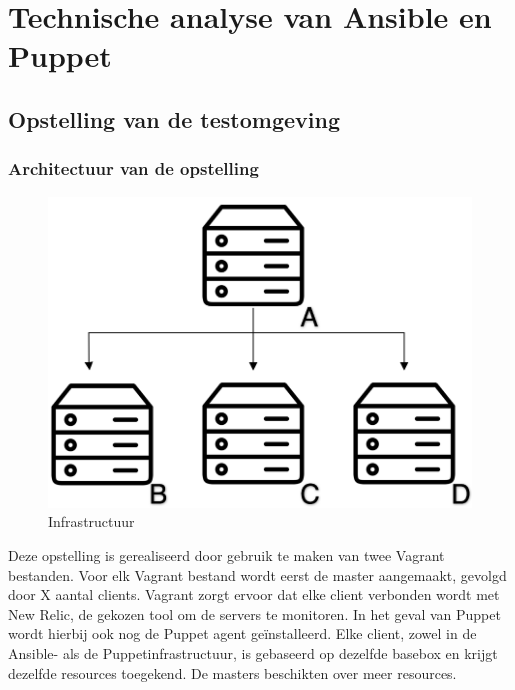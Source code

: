 
\section{Technische analyse van Ansible en Puppet}
\label{sec:technischeanalyse}
\subsection{Opstelling van de testomgeving}
\label{sec:opstellingtestevn}
\subsubsection{Architectuur van de opstelling}


\begin{figure}
	\includegraphics[width=0.9\linewidth]{img/infrastructruur.png} 
	\caption{Infrastructuur}
	\label{fig:infrastructuur}
\end{figure}



Deze opstelling is gerealiseerd door gebruik te maken van twee Vagrant bestanden. Voor elk Vagrant bestand wordt eerst de master aangemaakt, gevolgd door X aantal clients. Vagrant zorgt ervoor dat elke client  verbonden wordt met New Relic, de gekozen tool om de servers te monitoren. In het geval van Puppet wordt hierbij ook nog de Puppet agent ge\"installeerd. Elke client, zowel in de Ansible- als de Puppetinfrastructuur, is gebaseerd op dezelfde basebox en krijgt dezelfde resources toegekend. De masters beschikten over meer resources.

